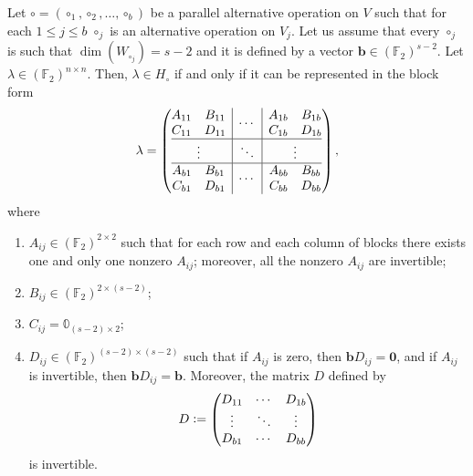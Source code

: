 \documentclass[10pt,a4paper]{amsart}
\newcommand{\F}{\mathbb{F}}
\newcommand{\defeq}{\vcentcolon=}
\newcommand{\lb}{\lambda}
\renewcommand{\b}{\textbf{b}}
\begin{document}
\begin{theorem}
	\label{thm:caratt_h0_msomme}
	Let $\circ =(\circ_{1}, \circ_{2}, \dots, \circ_{b})$ be a parallel alternative operation on $V$ such that for each $1\leq j \leq b$ $\circ_j$ is an alternative operation on $V_j$. Let us assume that every $\circ_{j}$ is such that $\dim(W_{\circ_j}) = s-2$ and it is defined by a vector $\b \in (\F_2)^{s-2}$.
	Let $\lb \in (\F_2)^{n\times n}$. Then, $\lb \in H_\circ$ if and only if it can be represented in the block form
	\[ 
	\lambda = 
	\left(\begin{array}{@{}c|c|c@{}}
		\begin{matrix}
			A_{11} & B_{11} \\
			C_{11} & D_{11}
		\end{matrix}
		&
		\cdots
		&
		\begin{matrix}
			A_{1b} & B_{1b} \\
			C_{1b} & D_{1b}
		\end{matrix}
		\\
		\hline
		\vdots
		&
		\ddots
		&
		\vdots
		\\
		\hline
		\begin{matrix}
			A_{b1} & B_{b1} \\
			C_{b1} & D_{b1}
		\end{matrix}
		&
		\cdots
		&
		\begin{matrix}
			A_{bb} & B_{bb} \\
			C_{bb} & D_{bb}
		\end{matrix}
		\\
	\end{array}\right),
	\]
	where
	\begin{enumerate}
		\item $A_{ij} \in (\F_2)^{2\times 2}$ such that for each row and each column of blocks there exists one and only one nonzero $A_{ij}$; moreover, all the nonzero $A_{ij}$ are invertible;
		\item $B_{ij} \in (\F_2)^{2 \times (s-2)}$;
		\item $C_{ij} = \mathbb{0}_{(s-2) \times 2}$;
		\item $D_{ij} \in (\F_2)^{(s-2) \times (s-2)}$ such that if $A_{ij}$ is zero, then $\b D_{ij}=\textbf{0}$, and if $A_{ij}$ is invertible, then $\b D_{ij} = \b$. Moreover, the matrix $D$ defined by
		\[
		D \defeq
		\begin{pmatrix}
			D_{11} & \cdots & D_{1b} \\
			\vdots & \ddots & \vdots \\
			D_{b1} & \cdots & D_{bb}
		\end{pmatrix}
		\]
		is invertible.
	\end{enumerate}
\end{theorem}
\end{document}
